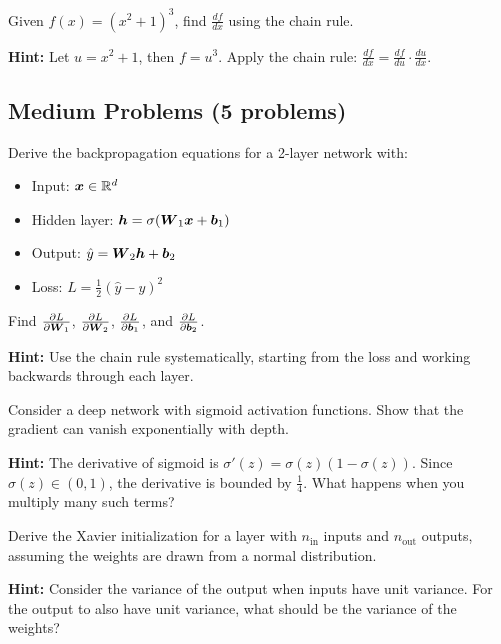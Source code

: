 \begin{problem}
\label{prob:chain-rule}

Given $f(x) = (x^2 + 1)^3$, find $\frac{df}{dx}$ using the chain rule.

\textbf{Hint:} Let $u = x^2 + 1$, then $f = u^3$. Apply the chain rule: $\frac{df}{dx} = \frac{df}{du} \cdot \frac{du}{dx}$.
\end{problem}

\subsection{Medium Problems (5 problems)}

\begin{problem}
\label{prob:backprop-derivation}

Derive the backpropagation equations for a 2-layer network with:
\begin{itemize}
    \item Input: $\boldsymbol{x} \in \mathbb{R}^d$
    \item Hidden layer: $\boldsymbol{h} = \sigma(\boldsymbol{W}_1 \boldsymbol{x} + \boldsymbol{b}_1)$
    \item Output: $\hat{y} = \boldsymbol{W}_2 \boldsymbol{h} + \boldsymbol{b}_2$
    \item Loss: $L = \frac{1}{2}(\hat{y} - y)^2$
\end{itemize}

Find $\frac{\partial L}{\partial \boldsymbol{W}_1}$, $\frac{\partial L}{\partial \boldsymbol{W}_2}$, $\frac{\partial L}{\partial \boldsymbol{b}_1}$, and $\frac{\partial L}{\partial \boldsymbol{b}_2}$.

\textbf{Hint:} Use the chain rule systematically, starting from the loss and working backwards through each layer.
\end{problem}

\begin{problem}
\label{prob:vanishing-gradient}

Consider a deep network with sigmoid activation functions. Show that the gradient can vanish exponentially with depth.

\textbf{Hint:} The derivative of sigmoid is $\sigma'(z) = \sigma(z)(1-\sigma(z))$. Since $\sigma(z) \in (0,1)$, the derivative is bounded by $\frac{1}{4}$. What happens when you multiply many such terms?
\end{problem}

\begin{problem}
\label{prob:weight-init}

Derive the Xavier initialization for a layer with $n_{\text{in}}$ inputs and $n_{\text{out}}$ outputs, assuming the weights are drawn from a normal distribution.

\textbf{Hint:} Consider the variance of the output when inputs have unit variance. For the output to also have unit variance, what should be the variance of the weights?
\end{problem}

